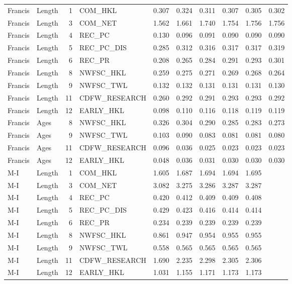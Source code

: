 \documentclass[11pt,
  english,
]{article}
\begin{document}
\begin{landscape}
\begin{longtable}[t]{llrlrrrrrr}
\endfoot
\bottomrule
\endlastfoot
Francis & Length & 1 & COM\_HKL & 0.307 & 0.324 & 0.311 & 0.307 & 0.305 & 0.302\\
Francis & Length & 3 & COM\_NET & 1.562 & 1.661 & 1.740 & 1.754 & 1.756 & 1.756\\
Francis & Length & 4 & REC\_PC & 0.130 & 0.096 & 0.091 & 0.090 & 0.090 & 0.090\\
Francis & Length & 5 & REC\_PC\_DIS & 0.285 & 0.312 & 0.316 & 0.317 & 0.317 & 0.319\\
Francis & Length & 6 & REC\_PR & 0.208 & 0.265 & 0.284 & 0.291 & 0.293 & 0.301\\
Francis & Length & 8 & NWFSC\_HKL & 0.259 & 0.275 & 0.271 & 0.269 & 0.268 & 0.264\\
Francis & Length & 9 & NWFSC\_TWL & 0.132 & 0.132 & 0.131 & 0.131 & 0.131 & 0.130\\
Francis & Length & 11 & CDFW\_RESEARCH & 0.260 & 0.292 & 0.291 & 0.293 & 0.293 & 0.292\\
Francis & Length & 12 & EARLY\_HKL & 0.098 & 0.110 & 0.116 & 0.118 & 0.119 & 0.119\\
Francis & Ages & 8 & NWFSC\_HKL & 0.326 & 0.304 & 0.290 & 0.285 & 0.283 & 0.273\\
Francis & Ages & 9 & NWFSC\_TWL & 0.103 & 0.090 & 0.083 & 0.081 & 0.081 & 0.080\\
Francis & Ages & 11 & CDFW\_RESEARCH & 0.096 & 0.036 & 0.025 & 0.023 & 0.023 & 0.023\\
Francis & Ages & 12 & EARLY\_HKL & 0.048 & 0.036 & 0.031 & 0.030 & 0.030 & 0.030\\
M-I & Length & 1 & COM\_HKL & 1.605 & 1.687 & 1.694 & 1.694 & 1.695 & \\
M-I & Length & 3 & COM\_NET & 3.082 & 3.275 & 3.286 & 3.287 & 3.287 & \\
M-I & Length & 4 & REC\_PC & 0.420 & 0.412 & 0.409 & 0.409 & 0.408 & \\
M-I & Length & 5 & REC\_PC\_DIS & 0.429 & 0.423 & 0.416 & 0.414 & 0.414 & \\
M-I & Length & 6 & REC\_PR & 0.234 & 0.239 & 0.239 & 0.239 & 0.239 & \\
M-I & Length & 8 & NWFSC\_HKL & 0.861 & 0.947 & 0.954 & 0.955 & 0.955 & \\
M-I & Length & 9 & NWFSC\_TWL & 0.558 & 0.565 & 0.565 & 0.565 & 0.565 & \\
M-I & Length & 11 & CDFW\_RESEARCH & 1.690 & 2.235 & 2.298 & 2.305 & 2.306 & \\
M-I & Length & 12 & EARLY\_HKL & 1.031 & 1.155 & 1.171 & 1.173 & 1.173 & \\

\end{longtable}
\end{landscape}
\end{document}
